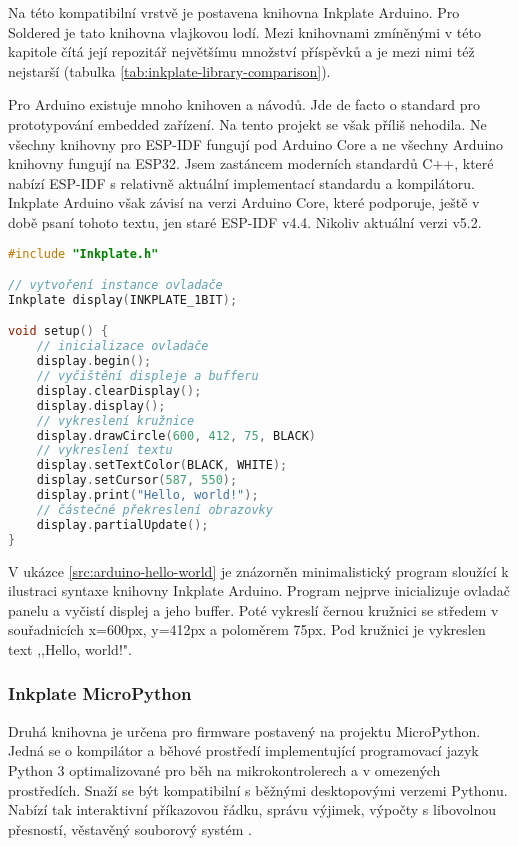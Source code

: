 Na této kompatibilní vrstvě je postavena knihovna Inkplate Arduino. Pro Soldered je tato knihovna vlajkovou lodí. Mezi knihovnami zmíněnými v této kapitole čítá její repozitář největšímu množství příspěvků a je mezi nimi též nejstarší (tabulka \ref{tab:inkplate-library-comparison}).

Pro Arduino existuje mnoho knihoven a návodů. Jde de facto o standard pro prototypování embedded zařízení. Na tento projekt se však příliš nehodila. Ne všechny knihovny pro ESP-IDF fungují pod Arduino Core a ne všechny Arduino knihovny fungují na ESP32. Jsem zastáncem moderních standardů C++, které nabízí ESP-IDF s relativně aktuální implementací standardu a kompilátoru. Inkplate Arduino však závisí na verzi Arduino Core, které podporuje, ještě v době psaní tohoto textu, jen staré ESP-IDF v4.4. Nikoliv aktuální verzi v5.2.

\begin{lstlisting}[label=src:arduino-hello-world,language=C++,caption={Ilustrační použití knihovny Inkplate Arduino}]
#include "Inkplate.h"

// vytvoření instance ovladače
Inkplate display(INKPLATE_1BIT);

void setup() {
    // inicializace ovladače
    display.begin();
    // vyčištění displeje a bufferu
    display.clearDisplay();
    display.display();
    // vykreslení kružnice
    display.drawCircle(600, 412, 75, BLACK)
    // vykreslení textu
    display.setTextColor(BLACK, WHITE);
    display.setCursor(587, 550);
    display.print("Hello, world!");
    // částečné překreslení obrazovky
    display.partialUpdate();
}
\end{lstlisting}

V ukázce \ref{src:arduino-hello-world} je znázorněn minimalistický program sloužící k ilustraci syntaxe knihovny Inkplate Arduino. Program nejprve inicializuje ovladač panelu a vyčistí displej a jeho buffer. Poté vykreslí černou kružnici se středem v souřadnicích x=600px, y=412px a poloměrem 75px. Pod kružnici je vykreslen text ,,Hello, world!".

\subsubsection{Inkplate MicroPython}
Druhá knihovna je určena pro firmware postavený na projektu MicroPython. Jedná se o kompilátor a běhové prostředí implementující programovací jazyk Python 3 optimalizované pro běh na mikrokontrolerech a v omezených prostředích. Snaží se být kompatibilní s běžnými desktopovými verzemi Pythonu. Nabízí tak interaktivní příkazovou řádku, správu výjimek, výpočty s libovolnou přesností, věstavěný souborový systém \cite{MicroPythonPythonMicrocontrollers}.


